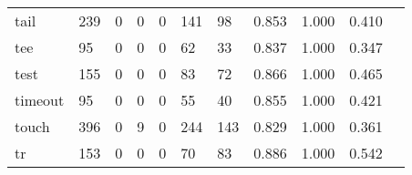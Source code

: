 \begin{longtable}{lp{1.2cm}p{1.2cm}p{1.2cm}p{1.2cm}p{1.2cm}p{1.2cm}p{1.2cm}p{1.2cm}p{1.2cm}p{1.2cm}}
tail      &                                   239 &                                                  0 &                                                  0 &                                                  0 &                                                141 &                                                 98 &                                         0.853 &                                              1.000 &                                              0.410 \\
tee       &                                    95 &                                                  0 &                                                  0 &                                                  0 &                                                 62 &                                                 33 &                                         0.837 &                                              1.000 &                                              0.347 \\
test      &                                   155 &                                                  0 &                                                  0 &                                                  0 &                                                 83 &                                                 72 &                                         0.866 &                                              1.000 &                                              0.465 \\
timeout   &                                    95 &                                                  0 &                                                  0 &                                                  0 &                                                 55 &                                                 40 &                                         0.855 &                                              1.000 &                                              0.421 \\
touch     &                                   396 &                                                  0 &                                                  9 &                                                  0 &                                                244 &                                                143 &                                         0.829 &                                              1.000 &                                              0.361 \\
tr        &                                   153 &                                                  0 &                                                  0 &                                                  0 &                                                 70 &                                                 83 &                                         0.886 &                                              1.000 &                                              0.542 \\

\end{longtable}
